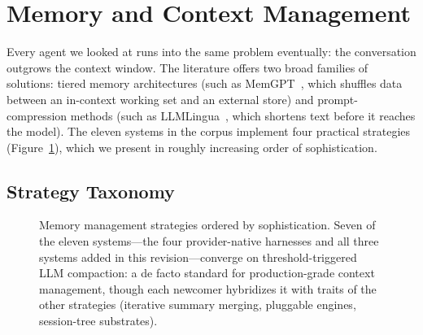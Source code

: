 \documentclass[11pt,a4paper]{article}
\newcommand{\clcode}{\textsc{Claude~Code}\xspace}
\newcommand{\cdx}{\textsc{Codex}\xspace}
\newcommand{\oh}{\textsc{OpenHands}\xspace}
\newcommand{\adr}{\textsc{Aider}\xspace}
\newcommand{\mswe}{\textsc{Mini-SWE-Agent}\xspace}
\newcommand{\ocl}{\textsc{OpenClaw}\xspace}
\newcommand{\vibe}{\textsc{Mistral~Vibe}\xspace}
\newcommand{\gemini}{\textsc{Gemini~CLI}\xspace}
\newcommand{\hrm}{\textsc{Hermes}\xspace}
\newcommand{\pib}{\textsc{Pi}\xspace}
\newcommand{\ocd}{\textsc{OpenCode}\xspace}
\begin{document}
\section{Memory and Context Management}
\label{sec:memory}

Every agent we looked at runs into the same problem eventually: the conversation outgrows the context window.
The literature offers two broad families of solutions: tiered memory architectures (such as MemGPT~\cite{packer2023memgpt}, which shuffles data between an in-context working set and an external store) and prompt-compression methods (such as LLMLingua~\cite{jiang2023llmlingua}, which shortens text before it reaches the model).
The eleven systems in the corpus implement four practical strategies (Figure~\ref{fig:memory}), which we present in roughly increasing order of sophistication.

\subsection{Strategy Taxonomy}

\begin{figure}[H]
\centering
{}
\caption{Memory management strategies ordered by sophistication. Seven of the eleven systems---the four provider-native harnesses and all three systems added in this revision---converge on threshold-triggered LLM compaction: a de facto standard for production-grade context management, though each newcomer hybridizes it with traits of the other strategies (iterative summary merging, pluggable engines, session-tree substrates).}
\label{fig:memory}
\end{figure}
\end{document}
